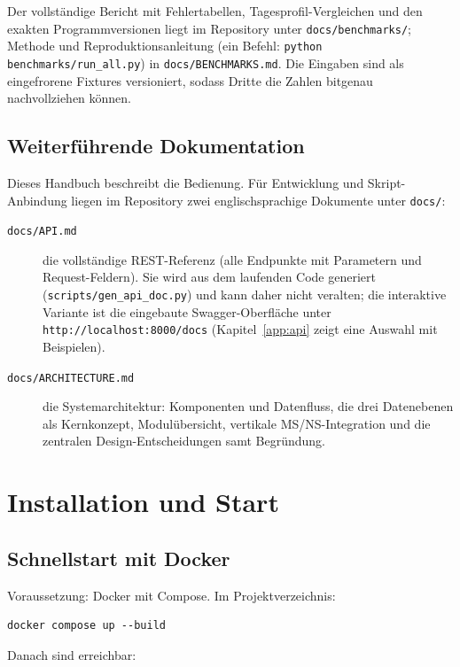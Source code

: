 \documentclass[11pt,a4paper,parskip=half]{scrreprt}
\newcommand{\api}[1]{\texttt{#1}}                    %
\begin{document}
Der vollständige Bericht mit Fehlertabellen, Tagesprofil-Vergleichen
und den exakten Programmversionen liegt im Repository unter
\texttt{docs/benchmarks/}; Methode und Reproduktionsanleitung (ein
Befehl: \texttt{python benchmarks/run\_all.py}) in
\texttt{docs/BENCHMARKS.md}. Die Eingaben sind als eingefrorene
Fixtures versioniert, sodass Dritte die Zahlen bitgenau
nachvollziehen können.

\section{Weiterführende Dokumentation}
\label{sec:weiterdoku}

Dieses Handbuch beschreibt die Bedienung. Für Entwicklung und
Skript-Anbindung liegen im Repository zwei englischsprachige
Dokumente unter \texttt{docs/}:

\begin{description}
  \item[\texttt{docs/API.md}] die vollständige REST-Referenz (alle
    Endpunkte mit Parametern und Request-Feldern). Sie wird aus dem
    laufenden Code generiert (\texttt{scripts/gen\_api\_doc.py}) und
    kann daher nicht veralten; die interaktive Variante ist die
    eingebaute Swagger-Oberfläche unter
    \api{http://localhost:8000/docs} (Kapitel~\ref{app:api} zeigt
    eine Auswahl mit Beispielen).
  \item[\texttt{docs/ARCHITECTURE.md}] die Systemarchitektur:
    Komponenten und Datenfluss, die drei Datenebenen als
    Kernkonzept, Modulübersicht, vertikale MS/NS-Integration und
    die zentralen Design-Entscheidungen samt Begründung.
\end{description}

\chapter{Installation und Start}

\section{Schnellstart mit Docker}

Voraussetzung: Docker mit Compose. Im Projektverzeichnis:

\begin{lstlisting}
docker compose up --build
\end{lstlisting}

Danach sind erreichbar:
\end{document}
